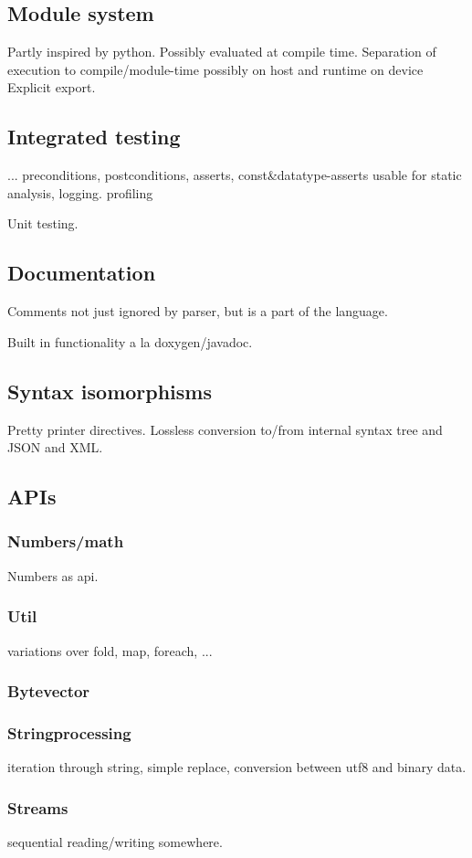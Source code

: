 \subsection{Module system}
Partly inspired by python. 
Possibly evaluated at compile time.
Separation of execution to compile/module-time possibly on host and runtime on device
Explicit export.

\subsection{Integrated testing}
... preconditions, postconditions, asserts, const\&datatype-asserts usable for static analysis, logging. profiling

Unit testing.

\subsection{Documentation}
Comments not just ignored by parser, but is a part of the language.

Built in functionality a la doxygen/javadoc.

\subsection{Syntax isomorphisms}
Pretty printer directives.
Lossless conversion to/from internal syntax tree and JSON and XML.

\subsection{APIs}
\subsubsection{Numbers/math}
Numbers as api.
\subsubsection{Util}
variations over fold, map, foreach, ...
\subsubsection{Bytevector}
\subsubsection{Stringprocessing}
iteration through string, simple replace, conversion between utf8 and binary data.
\subsubsection{Streams}
sequential reading/writing somewhere.
